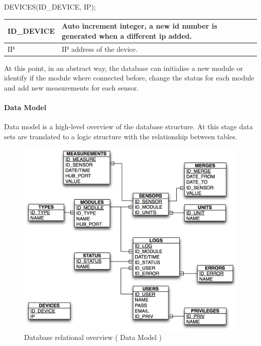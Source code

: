DEVICES(ID\_DEVICE, IP);

\begin{table}[H]
\centering
	\begin{tabular}{| p{2cm} | p{10cm} |}
		\hline
		ID\_DEVICE & Auto increment integer, a new id number is generated when a different ip added. \\\hline
		IP & IP address of the device. \\\hline
	\end{tabular}
\end{table}

At this point, in an abstract way, the database can initialise a new module or identify if the module where connected before, change the status for each module and add new measurements for each sensor.
\paragraph{Data Model}
Data model is a high-level overview of the database structure. At this stage data sets are translated to a logic structure with the relationship between tables.

\begin{figure}[H]
	\begin{centering}
		\includegraphics[width=1.0\textwidth]{images/db_datamodel.png}
		\caption{Database relational overview ( Data Model )}
	\end{centering}
\end{figure}

